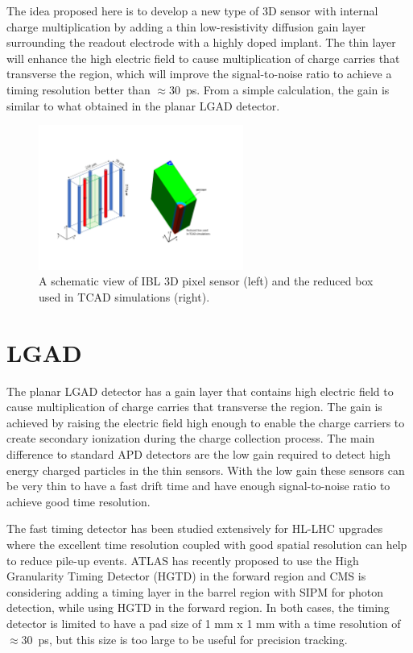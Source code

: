 \documentclass[aps,pt14,superscriptaddress,showpacs,floatfix,nofootinbib]{revtex4}
\begin{document}
The idea proposed here is to develop a new type of 3D sensor with internal
charge multiplication by adding a thin low-resistivity diffusion gain layer surrounding
the readout electrode with a highly doped implant.
The thin layer will enhance the high electric field to cause multiplication of
charge carries that transverse the region, which will improve the signal-to-noise ratio to
achieve a timing resolution better than $\approx$30~ps.
From a simple calculation, the gain is similar to what obtained
in the planar LGAD detector.

\begin{figure}[h!]
\begin{center}
\includegraphics[width=0.60\textwidth,keepaspectratio]{figures1/IBL3D_GL.pdf}
\caption{A schematic view of IBL 3D pixel sensor (left) and the reduced box used in TCAD simulations 
(right).\label{fig:ibl-3d}}
\end{center}
\end{figure}

\section{LGAD}

The planar LGAD detector has a gain layer that contains high electric field to
cause multiplication of charge carries that transverse the region.
The gain is achieved by raising the electric field high enough to enable the
charge carriers to create secondary ionization during the charge collection process.
The main difference to standard APD detectors are the low gain
required to detect high energy charged particles in the thin sensors.
With the low gain these sensors can be very thin to have a fast drift time
and have enough signal-to-noise ratio to achieve good time resolution.

The fast timing detector has been studied extensively for HL-LHC upgrades where the
excellent time resolution coupled with good spatial resolution can help to
reduce pile-up events. ATLAS has recently proposed to use the High Granularity
Timing Detector (HGTD) in the forward region and CMS is considering adding
a timing layer in the barrel region with SIPM for photon detection, while using HGTD
in the forward region. In both cases, the timing detector is 
limited to have a pad size of 1 mm x 1 mm with a time resolution of $\approx$30~ps, but this 
size is too large to be useful for precision tracking.
\end{document}
